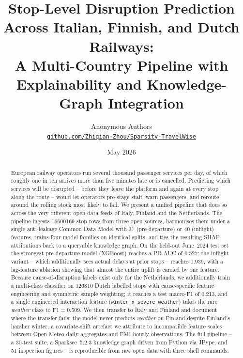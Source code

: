 \documentclass[11pt, a4paper]{article}
\title{\bfseries Stop-Level Disruption Prediction Across Italian, Finnish, and Dutch Railways:\\
        \large A Multi-Country Pipeline with Explainability and Knowledge-Graph Integration}
\author{Anonymous Authors\\\small\href{https://github.com/Zhiqian-Zhou/Sparsity-TravelWise}{\texttt{github.com/Zhiqian-Zhou/Sparsity-TravelWise}}}
\date{May 2026}
\begin{document}
\maketitle

\begin{abstract}
European railway operators run several thousand passenger services per day, of which roughly one in ten arrives more than five minutes late or is cancelled. Predicting which services will be disrupted -- before they leave the platform and again at every stop along the route -- would let operators pre-stage staff, warn passengers, and reroute around the rolling stock most likely to fail. We present a unified pipeline that does so across the very different open-data feeds of Italy, Finland and the Netherlands. The pipeline ingests \num{16600169} stop rows from three open sources, harmonises them under a single anti-leakage Common Data Model with 37 (pre-departure) or 40 (inflight) features, trains four model families on identical splits, and ties the resulting SHAP attributions back to a queryable knowledge graph. On the held-out June~2024 test set the strongest pre-departure model (XGBoost) reaches a PR-AUC of \num{0.527}; the inflight variant -- which additionally sees actual delays at prior stops -- reaches \num{0.939}, with a lag-feature ablation showing that almost the entire uplift is carried by one feature. Because cause-of-disruption labels exist only for the Netherlands, we additionally train a multi-class classifier on \num{126810} Dutch labelled stops with cause-specific feature engineering and symmetric sample weighting; it reaches a test macro-F1 of \num{0.213}, and a single engineered interaction feature (\texttt{winter\_x\_severe\_weather}) takes the rare \emph{weather} class to F1$=$\num{0.509}. We then transfer to Italy and Finland and document where the transfer fails: the model never predicts \emph{weather} on Finland despite Finland's harsher winter, a covariate-shift artefact we attribute to incompatible feature scales between Open-Meteo daily aggregates and FMI hourly observations. The full pipeline -- a 30-test suite, a Sparksee~5.2.3 knowledge graph driven from Python via JPype, and 51 inspection figures -- is reproducible from raw open data with three shell commands.
\end{abstract}

\tableofcontents
\newpage
















\appendix

\end{document}
